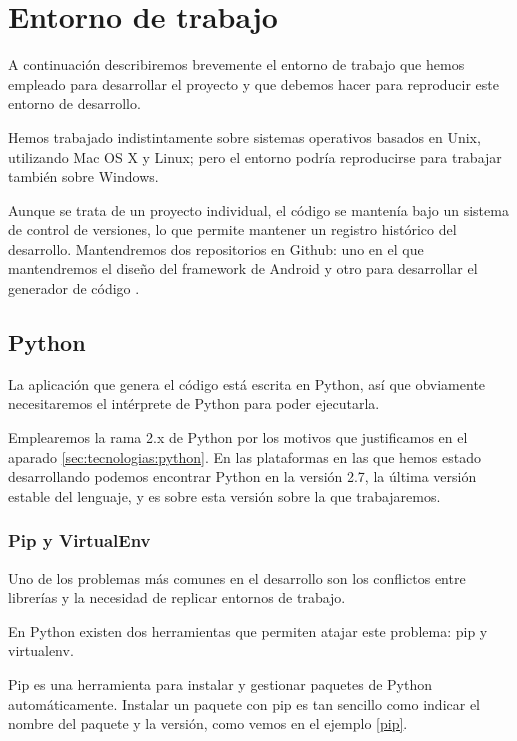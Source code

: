 \section{Entorno de trabajo}

A continuación describiremos brevemente el entorno de trabajo que hemos empleado para desarrollar el proyecto y que debemos hacer para reproducir este entorno de desarrollo.\par
Hemos trabajado indistintamente sobre sistemas operativos basados en Unix, utilizando Mac OS X y Linux; pero el entorno podría reproducirse para trabajar también sobre Windows.\par
Aunque se trata de un proyecto individual, el código se mantenía bajo un sistema de control de versiones, lo que permite mantener un registro histórico del desarrollo. Mantendremos dos repositorios en Github: uno en el que mantendremos el diseño del framework de Android \cite{meer:android} y otro para desarrollar el generador de código \cite{meer}.\par

\subsection{Python}
La aplicación que genera el código está escrita en Python, así que obviamente necesitaremos el intérprete de Python para poder ejecutarla.\par
Emplearemos la rama 2.x de Python por los motivos que justificamos en el aparado \ref{sec:tecnologias:python}. En las plataformas en las que hemos estado desarrollando podemos encontrar Python en la versión 2.7, la última versión estable del lenguaje, y es sobre esta versión sobre la que trabajaremos.\par

\subsubsection{Pip y VirtualEnv}\label{sec:virtualenv}
Uno de los problemas más comunes en el desarrollo son los conflictos entre librerías y la necesidad de replicar entornos de trabajo.\par 
En Python existen dos herramientas que permiten atajar este problema: pip y virtualenv. \par
Pip es una herramienta para instalar y gestionar paquetes de Python automáticamente. Instalar un paquete con pip es tan sencillo como indicar el nombre del paquete y la versión, como vemos en el ejemplo \ref{pip}.\par

